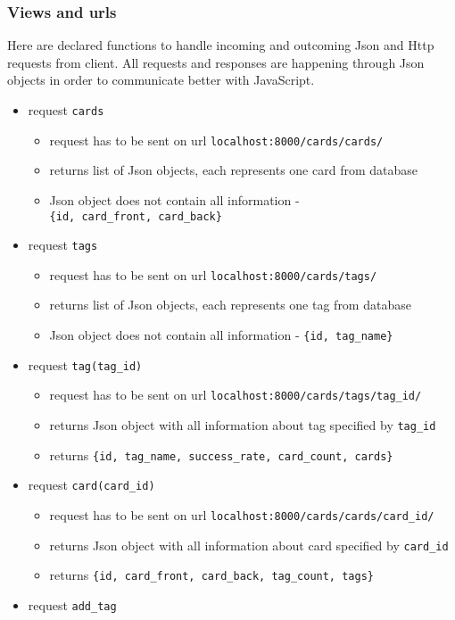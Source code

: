 \documentclass[12pt]{article}
\providecommand{\tightlist}{\setlength{\itemsep}{1pt}\setlength{\parskip}{1pt}}
\let\oldtexttt\texttt
\renewcommand{\texttt}[1]{\oldtexttt{\textcolor{codehighlight}{#1}}}
\begin{document}
\hypertarget{views-and-urls}{%
\subsubsection{Views and urls}\label{views-and-urls}}

Here are declared functions to handle incoming and outcoming Json and
Http requests from client. All requests and responses are happening
through Json objects in order to communicate better with JavaScript.

\begin{itemize}
\tightlist
\item
  request \texttt{cards}

  \begin{itemize}
  \tightlist
  \item
    request has to be sent on url \texttt{localhost:8000/cards/cards/}
  \item
    returns list of Json objects, each represents one card from database
  \item
    Json object does not contain all information -
    \texttt{\{id,\ card\_front,\ card\_back\}}
  \end{itemize}
\item
  request \texttt{tags}

  \begin{itemize}
  \tightlist
  \item
    request has to be sent on url \texttt{localhost:8000/cards/tags/}
  \item
    returns list of Json objects, each represents one tag from database
  \item
    Json object does not contain all information -
    \texttt{\{id,\ tag\_name\}}
  \end{itemize}
\item
  request \texttt{tag(tag\_id)}

  \begin{itemize}
  \tightlist
  \item
    request has to be sent on url
    \texttt{localhost:8000/cards/tags/tag\_id/}
  \item
    returns Json object with all information about tag specified by
    \texttt{tag\_id}
  \item
    returns
    \texttt{\{id,\ tag\_name,\ success\_rate,\ card\_count,\ cards\}}
  \end{itemize}
\item
  request \texttt{card(card\_id)}

  \begin{itemize}
  \tightlist
  \item
    request has to be sent on url
    \texttt{localhost:8000/cards/cards/card\_id/}
  \item
    returns Json object with all information about card specified by
    \texttt{card\_id}
  \item
    returns
    \texttt{\{id,\ card\_front,\ card\_back,\ tag\_count,\ tags\}}
  \end{itemize}
\item
  request \texttt{add\_tag}


\end{itemize}
\end{document}
